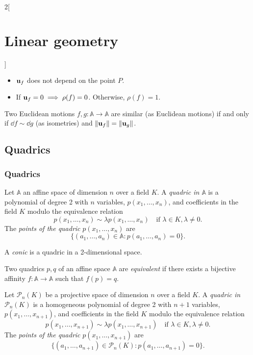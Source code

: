 \documentclass[../../../main.tex]{subfiles}
\begin{document}
\begin{multicols}{2}[\section{Linear geometry}]
\begin{prop}
\begin{itemize}
            \item $\boldsymbol{\mathrm{u}}_f$ does not depend on the point $P$.
            \item If $\boldsymbol{\mathrm{u}}_f=0\implies\rho(f)=0$. Otherwise, $\rho(f)=1$.
        \end{itemize}
    \end{prop}
    \begin{theorem}
        Two Euclidean motions $f,g:\mathbb{A}\rightarrow\mathbb{A}$ are similar (as Euclidean motions) if and only if $\dd f\sim \dd g$ (as isometries) and $\|\boldsymbol{\mathrm{u}}_f\|=\|\boldsymbol{\mathrm{u}}_g\|$.
    \end{theorem}
    \subsection{Quadrics}
    \subsubsection{Quadrics}
    \begin{definition}
        Let $\mathbb{A}$ an affine space of dimension $n$ over a field $K$. A \textit{quadric in $\mathbb{A}$} is a polynomial of degree 2 with $n$ variables, $p(x_1,\ldots,x_n)$, and coefficients in the field $K$ modulo the equivalence relation $$p(x_1,\ldots,x_n)\sim\lambda p(x_1,\ldots,x_n)\quad\text{if }\lambda\in K,\lambda\ne0.$$ The \textit{points of the quadric} $p(x_1,\ldots,x_n)$ are $$\{(a_1,\ldots,a_n)\in\mathbb{A}:p(a_1,\ldots,a_n)=0\}.$$
    \end{definition}
    \begin{definition}
        A \textit{conic} is a quadric in a 2-dimensional space.
    \end{definition}
    \begin{definition}
        Two quadrics $p,q$ of an affine space $\mathbb{A}$ are \textit{equivalent} if there exists a bijective affinity $f:\mathbb{A}\rightarrow\mathbb{A}$ such that $f(p)=q$.
    \end{definition}
    \begin{definition}
        Let $\mathcal{P}_n(K)$ be a projective space of dimension $n$ over a field $K$. A \textit{quadric in $\mathcal{P}_n(K)$} is a homogeneous polynomial of degree 2 with $n+1$ variables, $p(x_1,\ldots,x_{n+1})$, and coefficients in the field $K$ modulo the equivalence relation $$p(x_1,\ldots,x_{n+1})\sim\lambda p(x_1,\ldots,x_{n+1})\quad\text{if }\lambda\in K,\lambda\ne0.$$ The \textit{points of the quadric} $p(x_1,\ldots,x_{n+1})$ are $$\{(a_1,\ldots,a_{n+1})\in\mathcal{P}_n(K):p(a_1,\ldots,a_{n+1})=0\}.$$

\end{definition}
\end{multicols}
\end{document}
